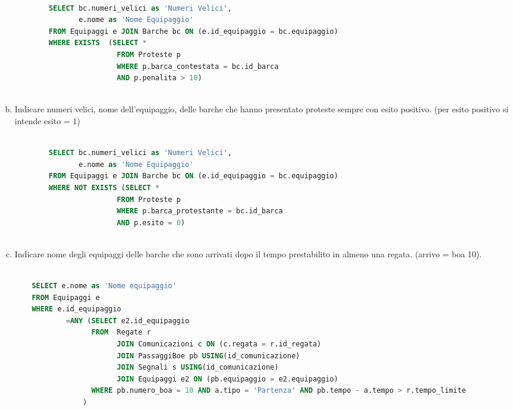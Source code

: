 \documentclass{article}
\begin{document}
\begin{enumerate}[a)]
    \lstset{style=bashstyle}
    \begin{lstlisting}[language=sql]
    
        SELECT bc.numeri_velici as 'Numeri Velici',
               e.nome as 'Nome Equipaggio'
        FROM Equipaggi e JOIN Barche bc ON (e.id_equipaggio = bc.equipaggio)
        WHERE EXISTS  (SELECT * 
                        FROM Proteste p
                        WHERE p.barca_contestata = bc.id_barca 
                        AND p.penalita > 10)
        
    \end{lstlisting} 
    
    \item Indicare numeri velici, nome dell'equipaggio, delle barche che hanno presentato proteste sempre con esito positivo. (per esito positivo si intende esito = 1)
    
    \lstset{style=bashstyle}
    \begin{lstlisting}[language=sql]
    
        SELECT bc.numeri_velici as 'Numeri Velici',
               e.nome as 'Nome Equipaggio'
        FROM Equipaggi e JOIN Barche bc ON (e.id_equipaggio = bc.equipaggio)
        WHERE NOT EXISTS (SELECT * 
                        FROM Proteste p
                        WHERE p.barca_protestante = bc.id_barca 
                        AND p.esito = 0)
        
    \end{lstlisting}
    
    \item Indicare nome degli equipaggi delle barche che sono arrivati dopo il tempo prestabilito in almeno una regata. \newline(arrivo = boa 10).
    
    \lstset{style=bashstyle}
    \begin{lstlisting}[language=sql]
    
    SELECT e.nome as 'Nome equipaggio'
    FROM Equipaggi e
    WHERE e.id_equipaggio 
            =ANY (SELECT e2.id_equipaggio
                  FROM  Regate r 
                        JOIN Comunicazioni c ON (c.regata = r.id_regata)
                        JOIN PassaggiBoe pb USING(id_comunicazione)
                        JOIN Segnali s USING(id_comunicazione)
                        JOIN Equipaggi e2 ON (pb.equipaggio = e2.equipaggio)
                  WHERE pb.numero_boa = 10 AND a.tipo = 'Partenza' AND pb.tempo - a.tempo > r.tempo_limite
                )
    
    \end{lstlisting}
    
\end{enumerate}
\end{document}
